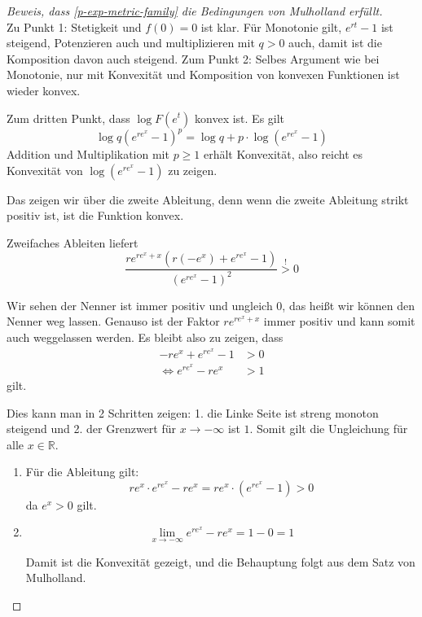   \begin{proof}[Beweis, dass \ref{p-exp-metric-family} die Bedingungen von Mulholland erfüllt]~\\
    Zu Punkt 1: Stetigkeit und $f(0) = 0$ ist klar. Für Monotonie gilt, $e^{rt} - 1$ ist steigend, Potenzieren auch und multiplizieren mit $q > 0$ auch, damit ist die Komposition davon auch steigend.
    Zum Punkt 2: Selbes Argument wie bei Monotonie, nur mit Konvexität und Komposition von konvexen Funktionen ist wieder konvex.

    Zum dritten Punkt, dass $\log F(e^t)$ konvex ist.
    Es gilt
    $$ \log q(e^{re^x} -1)^p = \log q + p \cdot  \log(e^{re^x} - 1) $$
    Addition und Multiplikation mit $p \geq 1$ erhält Konvexität, also reicht es Konvexität von $\log(e^{re^x} - 1)$ zu zeigen.

    Das zeigen wir über die zweite Ableitung, denn wenn die zweite Ableitung strikt positiv ist, ist die Funktion konvex.

    Zweifaches Ableiten liefert
    $$
    \frac{r e^{re^x + x} \left( r (-e^x) + e^{re^x} - 1 \right)}{\left( e^{re^x} - 1 \right)^2} \overset{!}{>} 0
    $$

Wir sehen der Nenner ist immer positiv und ungleich 0, das heißt wir können den Nenner weg lassen. Genauso ist der Faktor $r e^{re^x + x}$ immer positiv und kann somit auch weggelassen werden. Es bleibt also zu zeigen, dass
    \begin{align*}
      -r e^x + e^{re^x} - 1  &> 0 \\
      \iff  e^{re^x}  - r e^x & > 1 
    \end{align*}
    gilt.

    Dies kann man in 2 Schritten zeigen: 1. die Linke Seite ist streng monoton steigend und 2. der Grenzwert für $x \rightarrow - \infty$ ist $1$. Somit gilt die Ungleichung für alle $x \in \mathbb{R}$.

    \begin{enumerate}
      \item Für die Ableitung gilt:
        $$ re^x \cdot e^{re^x} - re^x = re^x \cdot (e^{re^x} - 1) > 0 $$ da $e^x > 0$ gilt.
      \item 
        $$ \lim_{x \rightarrow -\infty} e^{re^x}  - r e^x = 1 - 0 = 1 $$

      Damit ist die Konvexität gezeigt, und die Behauptung folgt aus dem Satz von Mulholland.
    \end{enumerate}
  \end{proof}


